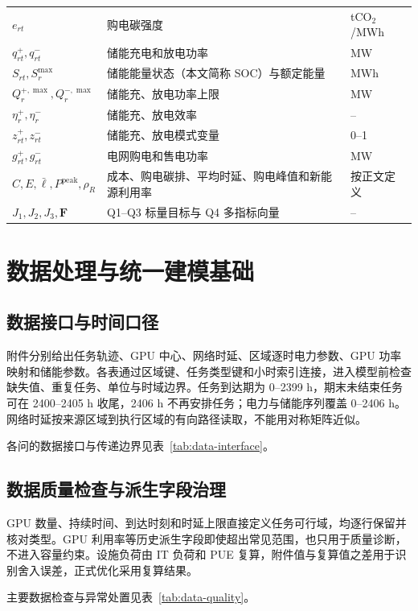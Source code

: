 {\begin{longtable}{@{}p{}p{}p{}@{}}
$e_{rt}$ & 购电碳强度 & tCO$_2$/MWh \\
$q^+_{rt},q^-_{rt}$ & 储能充电和放电功率 & MW \\
$S_{rt},S_r^{\max}$ & 储能能量状态（本文简称 SOC）与额定能量 & MWh \\
$Q_r^{+,\max},Q_r^{-,\max}$ & 储能充、放电功率上限 & MW \\
$\eta_r^+,\eta_r^-$ & 储能充、放电效率 & -- \\
$z^+_{rt},z^-_{rt}$ & 储能充、放电模式变量 & 0--1 \\
$g^+_{rt},g^-_{rt}$ & 电网购电和售电功率 & MW \\
$C,E,\bar\ell,P^{\mathrm{peak}},\rho_R$ & 成本、购电碳排、平均时延、购电峰值和新能源利用率 & 按正文定义 \\
$J_1,J_2,J_3,\boldsymbol F$ & Q1--Q3 标量目标与 Q4 多指标向量 & -- \\
\bottomrule
\end{longtable}
}

\section{数据处理与统一建模基础}

\subsection{数据接口与时间口径}

附件分别给出任务轨迹、GPU 中心、网络时延、区域逐时电力参数、GPU 功率映射和储能参数。各表通过区域键、任务类型键和小时索引连接，进入模型前检查缺失值、重复任务、单位与时域边界。任务到达期为 0--2399 h，期末未结束任务可在 2400--2405 h 收尾，2406 h 不再安排任务；电力与储能序列覆盖 0--2406 h。网络时延按来源区域到执行区域的有向路径读取，不能用对称矩阵近似。

各问的数据接口与传递边界见表~\ref{tab:data-interface}。

\TableDataInterfaces

\subsection{数据质量检查与派生字段治理}

GPU 数量、持续时间、到达时刻和时延上限直接定义任务可行域，均逐行保留并核对类型。GPU 利用率等历史派生字段即使超出常见范围，也只用于质量诊断，不进入容量约束。设施负荷由 IT 负荷和 PUE 复算，附件值与复算值之差用于识别舍入误差，正式优化采用复算结果。

主要数据检查与异常处置见表~\ref{tab:data-quality}。

